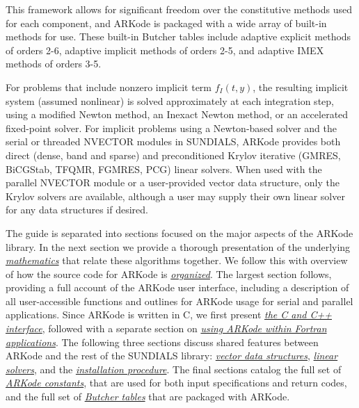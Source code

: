 \documentclass[letterpaper,10pt,english]{sphinxmanual}
\begin{document}
This framework allows for significant freedom over the constitutive
methods used for each component, and ARKode is packaged with a wide
array of built-in methods for use.  These built-in Butcher tables
include adaptive explicit methods of orders 2-6, adaptive implicit
methods of orders 2-5, and adaptive IMEX methods of orders 3-5.

For problems that include nonzero implicit term $f_I(t,y)$, the
resulting implicit system (assumed nonlinear) is solved approximately
at each integration step, using a modified Newton method, an Inexact
Newton method, or an accelerated fixed-point solver.  For implicit
problems using a Newton-based solver and the serial or threaded
NVECTOR modules in SUNDIALS, ARKode provides both direct (dense, band
and sparse) and preconditioned Krylov iterative (GMRES, BiCGStab,
TFQMR, FGMRES, PCG) linear solvers.  When used with the parallel
NVECTOR module or a user-provided vector data structure, only the
Krylov solvers are available, although a user may supply their own
linear solver for any data structures if desired.

The guide is separated into sections focused on the major aspects of
the ARKode library.  In the next section we provide a thorough
presentation of the underlying {\hyperref[Mathematics:mathematics]{\emph{mathematics}}} that
relate these algorithms together.  We follow this with overview of how
the source code for ARKode is {\hyperref[Organization:organization]{\emph{organized}}}.  The
largest section follows, providing a full account of the ARKode user
interface, including a description of all user-accessible functions
and outlines for ARKode usage for serial and parallel applications.
Since ARKode is written in C, we first present {\hyperref[c_interface/index:cinterface]{\emph{the C and C++
interface}}}, followed with a separate section on
{\hyperref[f_interface/index:fortraninterface]{\emph{using ARKode within Fortran applications}}}.  The
following three sections discuss shared features between ARKode and
the rest of the SUNDIALS library: {\hyperref[nvectors/index:nvectors]{\emph{vector data structures}}},
{\hyperref[linear_solvers/index:linearsolvers]{\emph{linear solvers}}}, and the {\hyperref[Install:installation]{\emph{installation
procedure}}}.  The final sections catalog the full set of
{\hyperref[Constants:constants]{\emph{ARKode constants}}}, that are used for both input
specifications and return codes, and the full set of
{\hyperref[Butcher:butcher]{\emph{Butcher tables}}} that are packaged with
ARKode.
\end{document}
